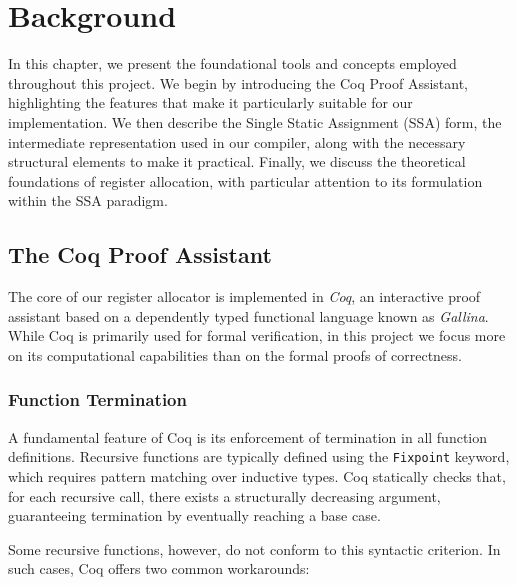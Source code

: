 
\chapter{Background}
\label{cha:background}

In this chapter, we present the foundational tools and concepts employed throughout this project. We begin by introducing the Coq Proof Assistant, highlighting the features that make it particularly suitable for our implementation. We then describe the Single Static Assignment (SSA) form, the intermediate representation used in our compiler, along with the necessary structural elements to make it practical. Finally, we discuss the theoretical foundations of register allocation, with particular attention to its formulation within the SSA paradigm.

\section{The Coq Proof Assistant}

The core of our register allocator is implemented in \textit{Coq}, an interactive proof assistant based on a dependently typed functional language known as \textit{Gallina}. While Coq is primarily used for formal verification, in this project we focus more on its computational capabilities than on the formal proofs of correctness.

\subsection{Function Termination}

A fundamental feature of Coq is its enforcement of termination in all function definitions. Recursive functions are typically defined using the \texttt{Fixpoint} keyword, which requires pattern matching over inductive types. Coq statically checks that, for each recursive call, there exists a structurally decreasing argument, guaranteeing termination by eventually reaching a base case.

Some recursive functions, however, do not conform to this syntactic criterion. In such cases, Coq offers two common workarounds:

